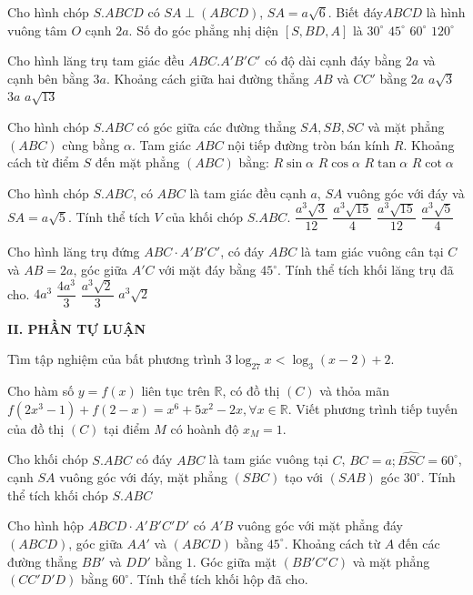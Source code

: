 \begin{ex}
Cho hình chóp $S.ABCD$ có $SA\perp (ABCD)$, $SA=a\sqrt{6}$. Biết đáy$ABCD$ là hình vuông tâm $O$ cạnh $2a$. Số đo góc phẳng nhị diện $\left[S, BD, A\right]$ là
\choice
{${{30}^\circ}$}
{${{45}^\circ}$}
{\True ${{60}^\circ}$}
{${{120}^\circ}$}
\end{ex}
\begin{ex}
Cho hình lăng trụ tam giác đều $ABC.A'B'C'$ có độ dài cạnh đáy bằng $2a$ và cạnh bên bằng $3a$. Khoảng cách giữa hai đường thẳng $AB$ và $CC'$ bằng
\choice
{$2a$}
{\True $a\sqrt{3}$}
{$3a$}
{$a\sqrt{13}$}
\end{ex}
\begin{ex}
Cho hình chóp $S.ABC$ có góc giữa các đường thẳng $SA, SB, SC$ và mặt phẳng $(ABC)$ cùng bằng $\alpha $. Tam giác $ABC$ nội tiếp đường tròn bán kính $R$. Khoảng cách từ điểm $S$ đến mặt phẳng $(ABC)$ bằng:
\choice
{$R\sin \alpha $}
{$R\cos \alpha $}
{\True $R\tan \alpha $}
{$R\cot \alpha $}
\end{ex}
\begin{ex}
Cho hình chóp $S.ABC$, có $ABC$ là tam giác đều cạnh $a$, $SA$ vuông góc với đáy và $SA=a\sqrt{5}$. Tính thể tích $V$ của khối chóp $S.ABC$.
\choice
{$\dfrac{a^3\sqrt{3}}{12}$}
{$\dfrac{a^3\sqrt{15}}{4}$}
{\True $\dfrac{a^3\sqrt{15}}{12}$}
{$\dfrac{a^3\sqrt{5}}{4}$}
\end{ex}
\begin{ex}
Cho hình lăng trụ đứng $ABC \cdot A'B'C'$, có đáy $ABC$ là tam giác vuông cân tại $C$ và $AB=2a$, góc giữa $A'C$ với mặt đáy bằng ${{45}^\circ}$. Tính thể tích khối lăng trụ đã cho.
\choice
{$4a^3$}
{$\dfrac{4a^3}{3}$}
{$\dfrac{a^3\sqrt{2}}{3}$}
{\True $a^3\sqrt{2}$}
\end{ex}

\noindent\textbf{II. PHẦN TỰ LUẬN}

\begin{ex}
Tìm tập nghiệm của bất phương trình $3\log_{27} x <\log_{3}(x-2)+2.$
\end{ex}
\begin{ex}
Cho hàm số $y=f(x)$ liên tục trên $\mathbb{R}$, có đồ thị $(C)$ và thỏa mãn $f\left(2x^3-1\right)+f(2-x)=x^6+5x^2-2x,\forall x\in \mathbb{R}$. Viết phương trình tiếp tuyến của đồ thị $(C)$ tại điểm $M$ có hoành độ $x_M=1$.
\end{ex}
\begin{ex}
Cho khối chóp $S.ABC$ có đáy $ABC$ là tam giác vuông tại $C$, $BC=a;\widehat{BSC}=60^\circ $, cạnh $SA$ vuông góc với đáy, mặt phẳng $(SBC)$ tạo với $(SAB)$ góc $30^\circ $. Tính thể tích khối chóp $S.ABC$
\end{ex}
\begin{ex}
Cho hình hộp $ABCD \cdot A'B'C'D'$ có $A'B$ vuông góc với mặt phẳng đáy $(ABCD)$, góc giữa $AA'$ và $(ABCD)$ bằng $45^\circ $. Khoảng cách từ $A$ đến các đường thẳng $BB'$ và $DD'$ bằng $1$. Góc giữa mặt $\left(BB'C'C\right)$ và mặt phẳng $\left(CC'D'D\right)$ bằng $60^\circ $. Tính thể tích khối hộp đã cho.
\end{ex}

